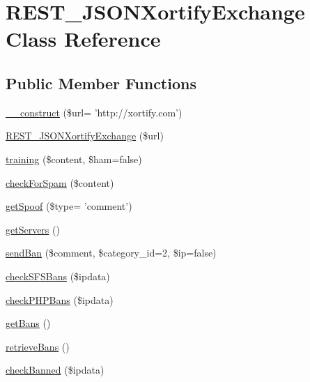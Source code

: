 \hypertarget{class_r_e_s_t___j_s_o_n_xortify_exchange}{\section{R\-E\-S\-T\-\_\-\-J\-S\-O\-N\-Xortify\-Exchange Class Reference}
\label{class_r_e_s_t___j_s_o_n_xortify_exchange}
}
\subsection*{Public Member Functions}
\begin{DoxyCompactItemize}
\item 
\hyperlink{class_r_e_s_t___j_s_o_n_xortify_exchange_a0e33a9b5cea89315431b2d440e576d5f}{\-\_\-\-\_\-construct} (\$url= 'http\-://xortify.\-com')
\item 
\hyperlink{class_r_e_s_t___j_s_o_n_xortify_exchange_ad0e8f0318847edab7a98c714cd47c63a}{R\-E\-S\-T\-\_\-\-J\-S\-O\-N\-Xortify\-Exchange} (\$url)
\item 
\hyperlink{class_r_e_s_t___j_s_o_n_xortify_exchange_a3b3be735e633ba330c6b5d086aa508cd}{training} (\$content, \$ham=false)
\item 
\hyperlink{class_r_e_s_t___j_s_o_n_xortify_exchange_a7a4f53c3841dc7806455261af557d514}{check\-For\-Spam} (\$content)
\item 
\hyperlink{class_r_e_s_t___j_s_o_n_xortify_exchange_ae7926cba79660f77479306100f492c03}{get\-Spoof} (\$type= 'comment')
\item 
\hyperlink{class_r_e_s_t___j_s_o_n_xortify_exchange_a882f365bc81e207dc2123ef707735e82}{get\-Servers} ()
\item 
\hyperlink{class_r_e_s_t___j_s_o_n_xortify_exchange_a0293acfa4afe0cb5b2816352a35d8ca7}{send\-Ban} (\$comment, \$category\-\_\-id=2, \$ip=false)
\item 
\hyperlink{class_r_e_s_t___j_s_o_n_xortify_exchange_a985a563a84e3e5c54694fcce192bda53}{check\-S\-F\-S\-Bans} (\$ipdata)
\item 
\hyperlink{class_r_e_s_t___j_s_o_n_xortify_exchange_aeb1bf9aaee4718870adbd07333490aaf}{check\-P\-H\-P\-Bans} (\$ipdata)
\item 
\hyperlink{class_r_e_s_t___j_s_o_n_xortify_exchange_aea26db2906896833d32445a698fc4cdc}{get\-Bans} ()
\item 
\hyperlink{class_r_e_s_t___j_s_o_n_xortify_exchange_a4af29af927aae9aada97ef0c2cd08fa1}{retrieve\-Bans} ()
\item 
\hyperlink{class_r_e_s_t___j_s_o_n_xortify_exchange_ae41df0f26620b727f7f63342648f6474}{check\-Banned} (\$ipdata)
\end{DoxyCompactItemize}
